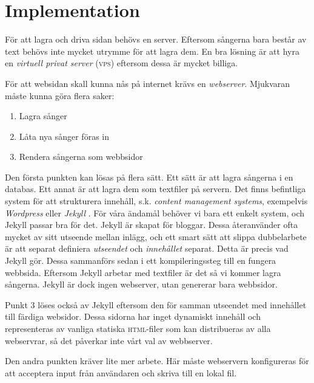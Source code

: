 \section{Implementation}


För att lagra och driva sidan behövs en server. Eftersom sångerna bara består av text behövs inte mycket utrymme för att lagra dem. En bra lösning är att hyra en \emph{virtuell privat server} (\textsc{vps}) eftersom dessa är mycket billiga.

För att websidan skall kunna nås på internet krävs en \emph{webserver}. Mjukvaran måste kunna göra flera saker:
\begin{enumerate}
    \item Lagra sånger \label{lst:storesongs}
    \item Låta nya sånger föras in
    \item Rendera sångerna som webbsidor
\end{enumerate}

Den första punkten kan lösas på flera sätt. Ett sätt är att lagra sångerna i en databas. Ett annat är att lagra dem som textfiler på servern. Det finns befintliga system för att strukturera innehåll, s.k. \emph{content management systems}, exempelvis \emph{Wordpress} \cite{wp} eller \emph{Jekyll} \cite{jekyll}. För våra ändamål behöver vi bara ett enkelt system, och Jekyll passar bra för det. Jekyll är skapat för bloggar. Dessa återanvänder ofta mycket av sitt utseende mellan inlägg, och ett smart sätt att slippa dubbelarbete är att separat definiera \emph{utseendet} och \emph{innehållet} separat. Detta är precis vad Jekyll gör. Dessa sammanförs sedan i ett kompileringssteg till en fungera webbsida. Eftersom Jekyll arbetar med textfiler är det så vi kommer lagra sångerna. Jekyll är dock ingen webserver, utan genererar bara webbsidor.

Punkt 3 löses också av Jekyll eftersom den för samman utseendet med innehållet till färdiga websidor. Dessa sidorna har inget dynamiskt innehåll och representeras av vanliga statiska \textsc{html}-filer som kan distribueras av alla webservrar, så det påverkar inte vårt val av webbserver.

Den andra punkten kräver lite mer arbete. Här måste webservern konfigureras för att acceptera input från användaren och skriva till en lokal fil. 